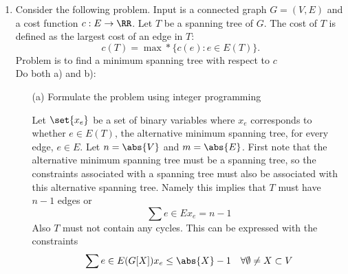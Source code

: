 \documentclass[11pt, oneside]{article}
\begin{document}
\begin{enumerate}
  \item %
    Consider the following problem.
    Input is a connected graph $G=(V,E)$ and a cost function $c:E \rightarrow \RR$.
    Let $T$ be a spanning tree of $G$. The cost of $T$ is defined as the largest cost of an edge
    in $T$:
    \[
      c(T) = \max*\{c(e): e \in E(T)\}.
    \]
    Problem is to find a minimum spanning tree with respect to $c$\\
    Do both a) and b):
    \begin{enumerate}
      \item[(a)] %
        Formulate the problem using integer programming

        Let $\set{x_e}$ be a set of binary variables where $x_e$ corresponds to
        whether $e \in E(T)$, the alternative minimum spanning tree, for every edge,
        $e \in E$.
        Let $n = \abs{V}$ and $m = \abs{E}$.
        First note that the alternative minimum spanning tree must be a spanning
        tree, so the constraints associated with a spanning tree must also be
        associated with this alternative spanning tree.
        Namely this implies that $T$ must have $n - 1$ edges or
        \[
          \sum{e \in E}{}{x_e} = n - 1
        \]
        Also $T$ must not contain any cycles.
        This can be expressed with the constraints
        \[
          \sum{e \in E(G[X])}{}{x_e} \le \abs{X} - 1 \quad \forall \emptyset \neq X \subset V
        \]


\end{enumerate}
\end{enumerate}
\end{document}
